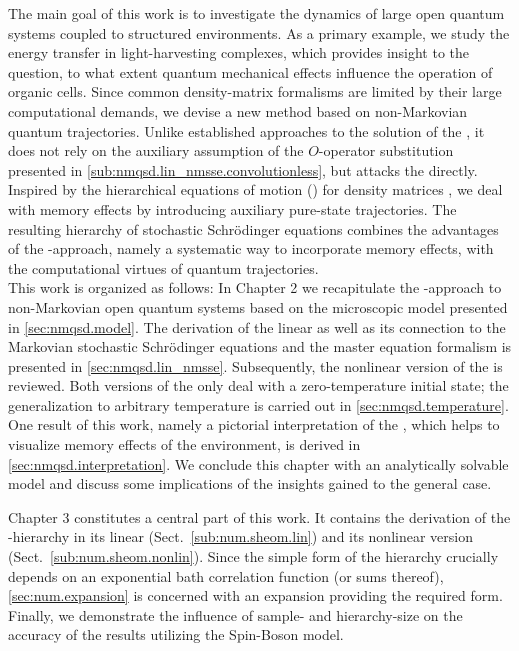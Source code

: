 The main goal of this work is to investigate the dynamics of large open quantum systems coupled to structured environments.
As a primary example, we study the energy transfer in light-harvesting complexes, which provides insight to the question, to what extent quantum mechanical effects influence the operation of organic cells.
Since common density-matrix formalisms are limited by their large computational demands, we devise a new method based on non-Markovian quantum trajectories.
Unlike established approaches to the solution of the \NMSSE \cite{YuDiGiSt99_pertubation,RoStEi11_nmqsd_aggregats}, it does not rely on the auxiliary assumption of the $O$-operator substitution presented in \autoref{sub:nmqsd.lin_nmsse.convolutionless}, but attacks the \NMSSE directly.
Inspired by the hierarchical equations of motion (\HEOM) for density matrices \cite{Ta06_stochastic}, we deal with memory effects by introducing auxiliary pure-state trajectories.
The resulting hierarchy of stochastic Schrödinger equations combines the advantages of the \HEOM-approach, namely a systematic way to incorporate memory effects, with the computational virtues of quantum trajectories.\\


This work is organized as follows:
In Chapter 2 we recapitulate the \NMSSE-approach to non-Markovian open quantum systems based on the microscopic model presented in \autoref{sec:nmqsd.model}.
The derivation of the linear \NMSSE as well as its connection to the Markovian stochastic Schrödinger equations and the master equation formalism is presented in \autoref{sec:nmqsd.lin_nmsse}.
Subsequently, the nonlinear version of the \NMSSE is reviewed.
Both versions of the \NMSSE only deal with a zero-temperature initial state; the generalization to arbitrary temperature is carried out in \autoref{sec:nmqsd.temperature}.
One result of this work, namely a pictorial interpretation of the \NMSSE, which helps to visualize memory effects of the environment, is derived in \autoref{sec:nmqsd.interpretation}.
We conclude this chapter with an analytically solvable model and discuss some implications of the insights gained to the general case.

Chapter 3 constitutes a central part of this work.
It contains the derivation of the \NMSSE-hierarchy in its linear (Sect.~\ref{sub:num.sheom.lin}) and its nonlinear version (Sect.~\ref{sub:num.sheom.nonlin}).
Since the simple form of the hierarchy crucially depends on an exponential bath correlation function (or sums thereof), \autoref{sec:num.expansion} is concerned with an expansion providing the required form.
Finally, we demonstrate the influence of sample- and hierarchy-size on the accuracy of the results utilizing the Spin-Boson model.

